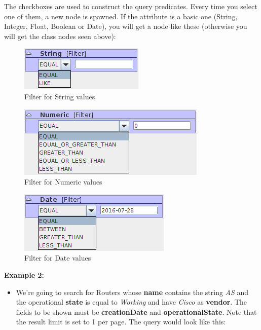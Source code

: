 \documentclass[a4paper]{article}
\begin{document}
	The checkboxes are used to construct the query predicates. Every time you select one of them, a new node is spawned. If the attribute is a basic one (String, Integer, Float, Boolean or Date), you will get a node like these (otherwise you will get the class nodes seen above):
	\begin{figure}[h!]
		\centering
		\includegraphics[width=0.3\linewidth]{img/query_string_filter.png}
		\caption{Filter for String values}
		\label{fig:query_string_filter}
	\end{figure}
	\newpage
	\begin{figure}[h!]
		\centering
		\includegraphics[width=0.4\linewidth]{img/query_filter_numeric.png}
		\caption{Filter for Numeric values}
		\label{fig:query_filter_numeric}
	\end{figure}
	\begin{figure}[h!]
		\centering
		\includegraphics[width=0.3\linewidth]{img/query_date_filter.png}
		\caption{Filter for Date values}
		\label{fig:query_date_filter}
	\end{figure}
	\begin{framed} {\large \textbf{Example 2:}}
		\begin{itemize}
			\item We're going to search for Routers whose \textbf{name} contains the string \textit{AS} and the operational \textbf{state} is equal to \textit{Working} and have \textit{Cisco} as \textbf{vendor}. The fields to be shown must be \textbf{creationDate} and \textbf{operationalState}. Note that the result limit is set to 1 per page.
			The query would look like this:
		\end{itemize}
	\end{framed}
\end{document}
